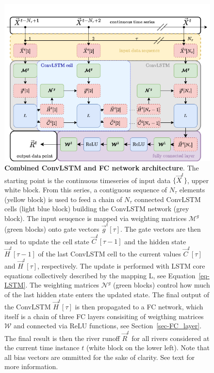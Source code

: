 \documentclass[
]{agujournal2019}
\begin{document}
\begin{figure}

{\centering \includegraphics{./ConvLSTM_FC.png}

}

\caption{\label{fig-ConvLSTM_FC}\textbf{Combined ConvLSTM and FC network
architecture}. The starting point is the continuous timeseries of input
data \(\{\vec{X}^t\}\), upper white block. From this series, a
contiguous sequence of \(N_\tau\) elements (yellow block) is used to
feed a chain of \(N_\tau\) connected ConvLSTM cells (light blue block)
building the ConvLSTM network (grey block). The input seuqence is mapped
via weighting matrices \(\pmb{\mathcal{M}}^g\) (green blocks) onto gate
vectors \(\vec{g}^t[\tau]\). The gate vectors are then used to update
the cell state \(\vec{C}^t[\tau-1]\) and the hidden state
\(\vec{H}^t[\tau-1]\) of the last ConvLSTM cell to the current values
\(\vec{C}^t[\tau]\) and \(\vec{H}^t[\tau]\), respectively. The update is
performed with LSTM core equations collectively described by the mapping
L, see Equation~\ref{eq-LSTM}. The weighting matrices
\(\pmb{\mathcal{N}}^g\) (green blocks) control how much of the last
hidden state enters the updated state. The final output of the ConvLSTM
\(\vec{H}^t[\tau]\) is then propagated to a FC network, which itself is
a chain of three FC layers consisiting of weigthing matrices
\(\pmb{\mathcal{W}}\) and connected via ReLU functions, see
Section~\ref{sec-FC_layer}. The final result is then the river runoff
\(\vec{R}^t\) for all rivers considered at the current time instance
\(t\) (white block on the lower left). Note that all bias vectors are
ommitted for the sake of clarity. See text for more information.}

\end{figure}
\end{document}
